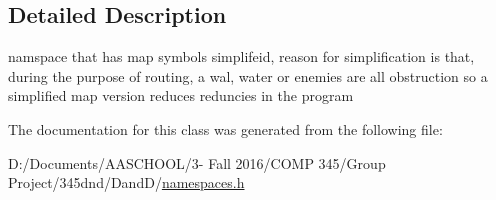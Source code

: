 \subsection{Detailed Description}
namspace that has map symbols simplifeid, reason for simplification is that, during the purpose of routing, a wal, water or enemies are all obstruction so a simplified map version reduces reduncies in the program 

The documentation for this class was generated from the following file\+:\begin{DoxyCompactItemize}
\item 
D\+:/\+Documents/\+A\+A\+S\+C\+H\+O\+O\+L/3-\/ Fall 2016/\+C\+O\+M\+P 345/\+Group Project/345dnd/\+Dand\+D/\hyperlink{namespaces_8h}{namespaces.\+h}\end{DoxyCompactItemize}
